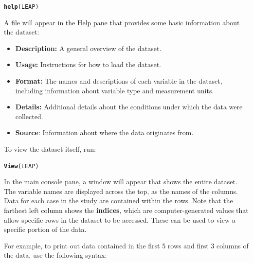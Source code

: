 \documentclass{report}\usepackage[]{graphicx}\usepackage[]{color}
\makeatletter
\newcommand{\hlstd}[1]{\textcolor[rgb]{0.345,0.345,0.345}{#1}}%
\newcommand{\hlkwd}[1]{\textcolor[rgb]{0.737,0.353,0.396}{\textbf{#1}}}%
\newenvironment{kframe}{%
 \def\at@end@of@kframe{}%
 \ifinner\ifhmode%
  \def\at@end@of@kframe{\end{minipage}}%
  \begin{minipage}{\columnwidth}%
 \fi\fi%
 \def\FrameCommand##1{\hskip\@totalleftmargin \hskip-\fboxsep
 \colorbox{shadecolor}{##1}\hskip-\fboxsep
     \hskip-\linewidth \hskip-\@totalleftmargin \hskip\columnwidth}%
 \MakeFramed {\advance\hsize-\width
   \@totalleftmargin\z@ \linewidth\hsize
   \@setminipage}}%
 {\par\unskip\endMakeFramed%
 \at@end@of@kframe}
\newenvironment{knitrout}{}{} %
\makeatother
\begin{document}
\begin{knitrout}
\color{fgcolor}\begin{kframe}
\begin{alltt}
\hlkwd{help}\hlstd{(LEAP)}
\end{alltt}
\end{kframe}
\end{knitrout}

A file will appear in the Help pane that provides some basic information about the dataset:

\begin{itemize}
\item \textbf{Description:} A general overview of the dataset. 
\item \textbf{Usage:} Instructions for how to load the dataset. 
\item \textbf{Format:} The names and descriptions of each variable in the dataset, including information about variable type and measurement units.
\item \textbf{Details:} Additional details about the conditions under which the data were collected.
\item \textbf{Source}: Information about where the data originates from.
\end{itemize}

To view the dataset itself, run:

\begin{knitrout}
\color{fgcolor}\begin{kframe}
\begin{alltt}
\hlkwd{View}\hlstd{(LEAP)}
\end{alltt}
\end{kframe}
\end{knitrout}

In the main console pane, a window will appear that shows the entire dataset. The variable names are displayed across the top, as the names of the columns. Data for each case in the study are contained within the rows. Note that the farthest left column shows the \textbf{indices}, which are computer-generated values that allow specific rows in the dataset to be accessed. These can be used to view a specific portion of the data.

For example, to print out data contained in the first 5 rows and first 3 columns of the data, use the following syntax:
\end{document}
